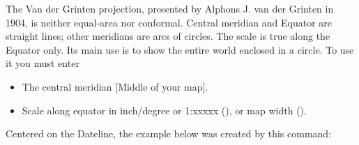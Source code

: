 
The Van der Grinten projection, presented by Alphons J. van der Grinten in 1904,
is neither equal-area nor conformal.  Central meridian
and Equator are straight lines; other meridians are
arcs of circles.  The scale is true along the Equator only.
Its main use is to show the entire world enclosed in a circle.
To use it you must enter

\begin{itemize} 
\item The central meridian [Middle of your map].
\item Scale along equator in inch/degree or 1:xxxxx (), or map width ().
\end{itemize} 

Centered on the Dateline, the example below was created by this command:




